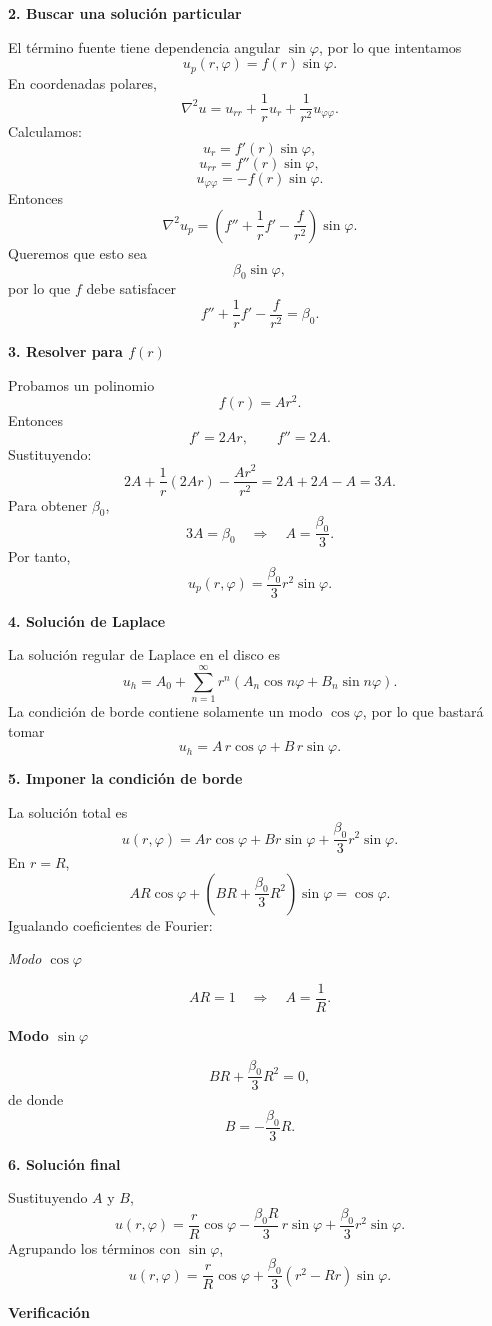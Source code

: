\documentclass[12pt]{article}
\begin{document}
{\bf 2. Buscar una solución particular}

El término fuente tiene dependencia angular $\sin\varphi$, por lo que intentamos
$$
u_p(r,\varphi)=f(r)\sin\varphi.
$$
En coordenadas polares,
$$
\nabla^2u=
u_{rr}
+\frac1r u_r
+\frac1{r^2}u_{\varphi\varphi}.
$$
Calculamos:
$$
u_r=f'(r)\sin\varphi,
$$
$$
u_{rr}=f''(r)\sin\varphi,
$$
$$
u_{\varphi\varphi}
=-f(r)\sin\varphi.
$$
Entonces
$$
\nabla^2u_p
=
\left(
f''+\frac1r f'
-\frac{f}{r^2}
\right)\sin\varphi.
$$
Queremos que esto sea
$$
\beta_0\sin\varphi,
$$
por lo que $f$ debe satisfacer
$$
f''+\frac1r f'
-\frac{f}{r^2}
=
\beta_0.
$$

{\bf 3. Resolver para $f(r)$}

Probamos un polinomio
$$
f(r)=Ar^2.
$$
Entonces
$$
f'=2Ar,
\qquad
f''=2A.
$$
Sustituyendo:
$$
2A+\frac1r(2Ar)-\frac{Ar^2}{r^2}
=
2A+2A-A
=
3A.
$$
Para obtener $\beta_0$,
$$
3A=\beta_0
\quad\Longrightarrow\quad
A=\frac{\beta_0}{3}.
$$
Por tanto,
$$
\boxed{
u_p(r,\varphi)
=
\frac{\beta_0}{3}r^2\sin\varphi.
}
$$

{\bf 4. Solución de Laplace}

La solución regular de Laplace en el disco es
$$
u_h
=
A_0
+
\sum_{n=1}^{\infty}
r^n
\left(
A_n\cos n\varphi
+
B_n\sin n\varphi
\right).
$$
La condición de borde contiene solamente un modo $\cos\varphi$, por lo que bastará tomar
$$
u_h
=
A\,r\cos\varphi
+
B\,r\sin\varphi .
$$

{\bf 5. Imponer la condición de borde}

La solución total es
$$
u(r,\varphi)
=
A r\cos\varphi
+
B r\sin\varphi
+
\frac{\beta_0}{3}r^2\sin\varphi.
$$
En $r=R$,
$$
A R\cos\varphi
+
\left(
BR+\frac{\beta_0}{3}R^2
\right)\sin\varphi
=
\cos\varphi.
$$
Igualando coeficientes de Fourier:

{\em Modo $\cos\varphi$}

$$
AR=1
\quad\Longrightarrow\quad
A=\frac1R.
$$

{\bf Modo $\sin\varphi$}

$$
BR+\frac{\beta_0}{3}R^2=0,
$$
de donde
$$
B=-\frac{\beta_0}{3}R.
$$

{\bf 6. Solución final}

Sustituyendo $A$ y $B$,
$$
u(r,\varphi)
=
\frac{r}{R}\cos\varphi
-\frac{\beta_0R}{3}\,r\sin\varphi
+\frac{\beta_0}{3}r^2\sin\varphi.
$$
Agrupando los términos con $\sin\varphi$,
$$
\boxed{
u(r,\varphi)
=
\frac{r}{R}\cos\varphi
+
\frac{\beta_0}{3}
\left(r^2-Rr\right)\sin\varphi.
}
$$

{\bf Verificación}
\end{document}
